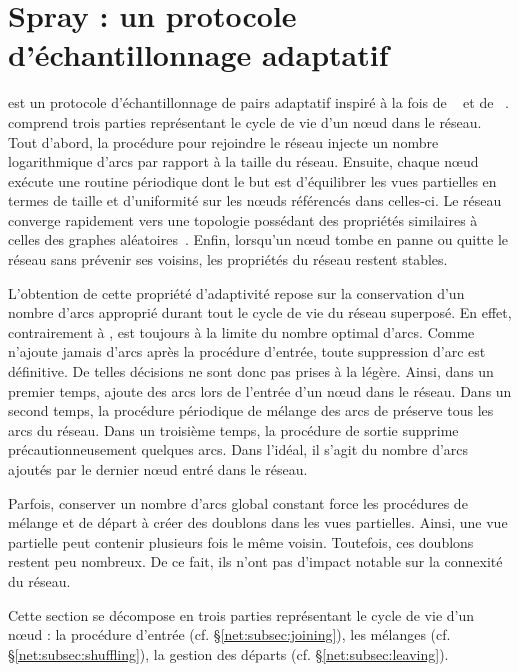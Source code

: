 
\section{Spray : un protocole d'échantillonnage adaptatif}
\label{net:sec:spray}

\SPRAY est un protocole d'échantillonnage de pairs adaptatif inspiré à la fois
de \SCAMP~\cite{ganesh2003peer} et de \CYCLON~\cite{voulgaris2005cyclon}. \SPRAY
comprend trois parties représentant le cycle de vie d'un nœud dans le
réseau. Tout d'abord, la procédure pour rejoindre le réseau injecte un nombre
logarithmique d'arcs par rapport à la taille du réseau.  Ensuite, chaque nœud
exécute une routine périodique dont le but est d'équilibrer les vues partielles
en termes de taille et d'uniformité sur les nœuds référencés dans celles-ci. Le
réseau converge rapidement vers une topologie possédant des propriétés
similaires à celles des graphes aléatoires~\cite{erdos1959random}. Enfin,
lorsqu'un nœud tombe en panne ou quitte le réseau sans prévenir ses voisins, les
propriétés du réseau restent stables.

L'obtention de cette propriété d'adaptivité repose sur la conservation d'un
nombre d'arcs approprié durant tout le cycle de vie du réseau superposé.  En
effet, contrairement à \CYCLON, \SPRAY est toujours à la limite du nombre
optimal d'arcs. Comme \SPRAY n'ajoute jamais d'arcs après la procédure d'entrée,
toute suppression d'arc est définitive. De telles décisions ne sont donc pas
prises à la légère. Ainsi, dans un premier temps, \SPRAY ajoute des arcs lors de
l'entrée d'un nœud dans le réseau. Dans un second temps, la procédure périodique
de mélange des arcs de \SPRAY préserve tous les arcs du réseau.  Dans un
troisième temps, la procédure de sortie supprime précautionneusement quelques
arcs. Dans l'idéal, il s'agit du nombre d'arcs ajoutés par le dernier nœud entré
dans le réseau.

Parfois, conserver un nombre d'arcs global constant force les procédures de
mélange et de départ à créer des doublons dans les vues partielles. Ainsi, une
vue partielle peut contenir plusieurs fois le même voisin. Toutefois, ces
doublons restent peu nombreux. De ce fait, ils n'ont pas d'impact notable sur la
connexité du réseau.

Cette section se décompose en trois parties représentant le cycle de vie d'un
nœud : la procédure d'entrée (cf. §\ref{net:subsec:joining}), les mélanges
(cf. §\ref{net:subsec:shuffling}), la gestion des départs
(cf. §\ref{net:subsec:leaving}).

